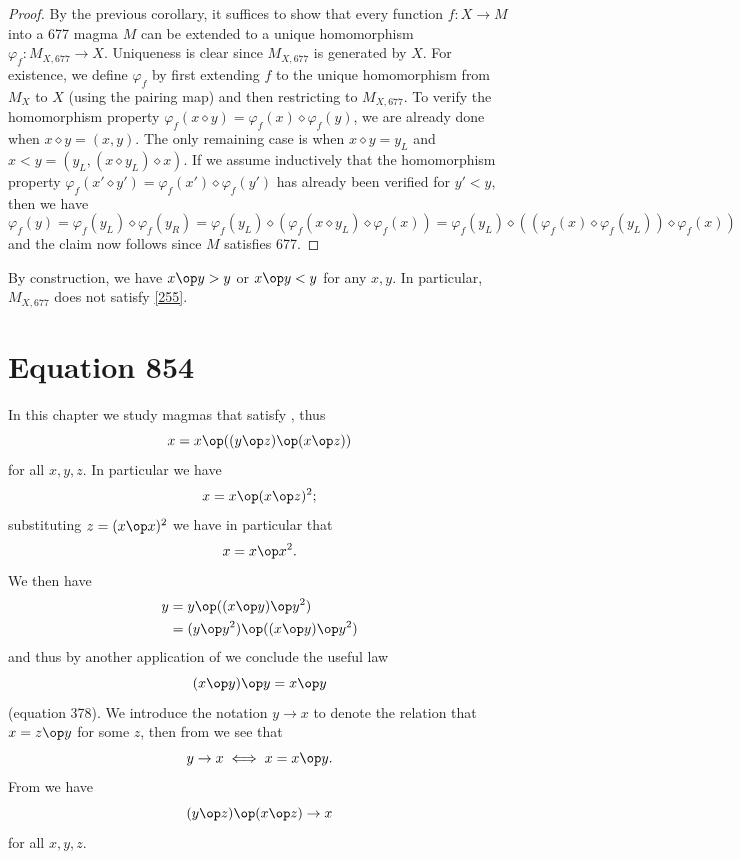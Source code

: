 \begin{proof}  By the previous corollary, it suffices to show that every function $f: X \to M$ into a 677 magma $M$ can be extended to a unique homomorphism $\varphi_f: M_{X,677} \to X$. Uniqueness is clear since $M_{X,677}$ is generated by $X$.  For existence, we define $\varphi_f$ by first extending $f$ to the unique homomorphism from $M_X$ to $X$ (using the pairing map) and then restricting to $M_{X,677}$.  To verify the homomorphism property $\varphi_f(x \diamond y) = \varphi_f(x) \diamond \varphi_f(y)$, we are already done when $x \diamond y = (x,y)$. The only remaining case is when $x \diamond y = y_L$ and $x < y = (y_L,  (x \diamond y_L) \diamond x)$.   If we assume inductively that the homomorphism property $\varphi_f(x' \diamond y') = \varphi_f(x') \diamond \varphi_f(y')$ has already been verified for $y' < y$, then we have
  $$ \varphi_f(y) = \varphi_f(y_L) \diamond \varphi_f(y_R) = \varphi_f(y_L) \diamond (\varphi_f(x \diamond y_L) \diamond \varphi_f(x)) =  \varphi_f(y_L) \diamond ((\varphi_f(x) \diamond \varphi_f(y_L)) \diamond \varphi_f(x))$$
  and the claim now follows since $M$ satisfies 677.
\end{proof}

By construction, we have $x \op y > y$ or $x \op y < y$ for any $x,y$.  In particular, $M_{X,677}$ does not satisfy \eqref{255}.


\chapter{Equation 854}\label{854-chapter}

In this chapter we study magmas that satisfy , thus
\begin{equation}\label{854}
  x = x \op ((y \op z) \op (x \op z))
\end{equation}
for all $x,y,z$.  In particular we have
$$ x = x \op (x \op z)^2;$$
substituting $z  = (x \op x)^2$ we have in particular that
\begin{equation}\label{8}
  x = x \op x^2.
\end{equation}
We then have
\begin{align*}
  y &= y \op ((x \op y) \op y^2) \\
  & = (y \op y^2) \op ((x \op y) \op y^2)
\end{align*}
and thus by another application of  we conclude the useful law
\begin{equation}\label{378}
   (x \op y) \op y = x \op y
\end{equation}
(equation 378).  We introduce the notation $y \to x$ to denote the relation that $x = z \op y$ for some $z$, then from  we see that
\begin{equation}\label{yx}
  y \to x \iff x = x \op y.
\end{equation}
From  we have
\begin{equation}\label{854-alt}
  (y \op z) \op (x \op z) \to x
\end{equation}
for all $x,y,z$.

